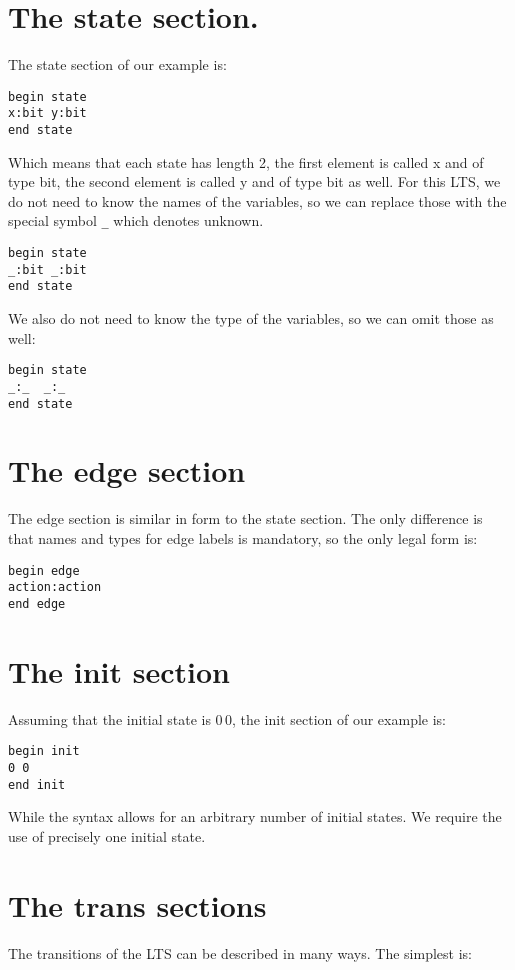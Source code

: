 \section{The state section.}

The state section of our example is:
\begin{verbatim}
begin state
x:bit y:bit
end state
\end{verbatim}
Which means that each state has length 2, the first element is called x and of type bit,
the second element is called y and of type bit as well. For this LTS, we do not need to know the
names of the variables, so we can replace those with the special symbol \verb+_+  which denotes unknown.
\begin{verbatim}
begin state
_:bit _:bit
end state
\end{verbatim}
We also do not need to know the type of the variables, so we can omit those as well:
\begin{verbatim}
begin state
_:_  _:_
end state
\end{verbatim}

\section{The edge section}

The edge section is similar in form to the state section. The only difference is that
names and types for edge labels is mandatory, so the only legal form is:
\begin{verbatim}
begin edge
action:action
end edge
\end{verbatim}

\section{The init section}

Assuming that the initial state is $0\,0$, the init section of our example is:
\begin{verbatim}
begin init
0 0
end init
\end{verbatim}

While the syntax allows for an arbitrary number of initial states.
We require the use of precisely one initial state.

\section{The trans sections}

The transitions of the LTS can be described in many ways.
The simplest is:

